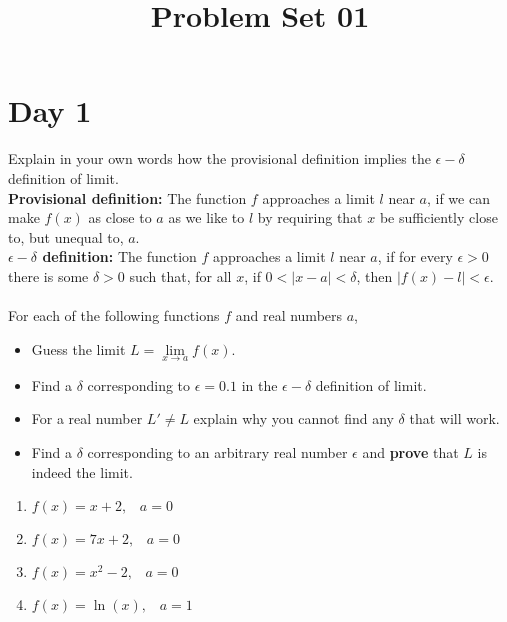 \documentclass[11pt, a4paper, oneside]{amsart}
\title{Problem Set 01}
\begin{document}
\maketitle
\thispagestyle{fancy}

\section*{Day 1}
\vspace{1em}

Explain in your own words how the provisional definition implies the $\epsilon-\delta$ definition of limit.\\


\textbf{Provisional definition:} The function $f$ approaches a limit $l$ near $a$, if we can make $f(x)$ as close to $a$ as we like to $l$ by requiring that $x$ be sufficiently close to, but unequal to, $a$.\\

\textbf{$\epsilon-\delta$ definition:} The function $f$ {approaches a limit} $l$ near $a$, if for every $\epsilon > 0$ there is some $\delta > 0$ such that, for all $x$, if $0 < |x - a| < \delta$, then $|f(x) - l| < \epsilon$.\\\\


For each of the following functions $f$ and real numbers $a$,
\begin{itemize}
	\item Guess the limit $L = \lim \limits _ {x \rightarrow a} f(x)$.
	\item Find a $\delta$ corresponding to $\epsilon = 0.1$ in the $\epsilon - \delta$ definition of limit.
	\item For a real number $L' \neq L$ explain why you cannot find any $\delta$ that will work.
	\item Find a $\delta$ corresponding to an arbitrary real number $\epsilon$ and \textbf{prove} that $L$ is indeed the limit.\\
\end{itemize}

\begin{enumerate}
	\item $f(x)=x+2, \hspace{10pt} a=0$
	\item $f(x)=7x+ 2, \hspace{10pt} a=0$
	\item $f(x)=x^2-2, \hspace{10pt} a=0$
	\item $f(x)=\ln(x), \hspace{10pt} a=1$
\end{enumerate}
\end{document}
